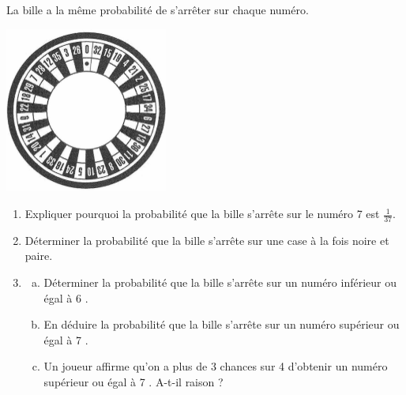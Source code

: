 \documentclass[a4paper,14pt]{extarticle}
\begin{document}
La bille a la même probabilité de s'arrêter sur chaque numéro.

\begin{center}
\includegraphics[max width=0.4\textwidth]{ex1}
\end{center}

\begin{enumerate}
  \item Expliquer pourquoi la probabilité que la bille s'arrête sur le numéro 7 est $\frac{1}{37}$.

  \item Déterminer la probabilité que la bille s'arrête sur une case à la fois noire et paire.

  \item \begin{enumerate}[a.] 
      \item Déterminer la probabilité que la bille s'arrête sur un numéro inférieur ou égal à 6 .

      \item En déduire la probabilité que la bille s'arrête sur un numéro supérieur ou égal à 7 .

      \item Un joueur affirme qu'on a plus de 3 chances sur 4 d'obtenir un numéro supérieur ou égal à 7 . A-t-il raison ?
        
    \end{enumerate}
\end{enumerate}
\newpage
\end{document}

